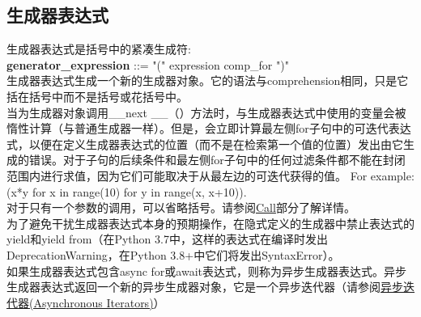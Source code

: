\documentclass[10pt,UTF8]{ctexart}
\begin{document}
\subsection{生成器表达式}
生成器表达式是括号中的紧凑生成符:\\
\textbf{generator_expression} ::= "(" expression comp_for ")"\\
\indent 生成器表达式生成一个新的生成器对象。它的语法与comprehension相同，只是它括在括号中而不是括号或花括号中。\\
\indent 当为生成器对象调用__next __（）方法时，与生成器表达式中使用的变量会被惰性计算（与普通生成器一样）。但是，会立即计算最左侧for子句中的可迭代表达式，以便在定义生成器表达式的位置（而不是在检索第一个值的位置）发出由它生成的错误。对于子句的后续条件和最左侧for子句中的任何过滤条件都不能在封闭范围内进行求值，因为它们可能取决于从最左边的可迭代获得的值。 For example: (x*y for x in range(10) for y in range(x, x+10)).\\
\indent 对于只有一个参数的调用，可以省略括号。请参阅\href{https://docs.python.org/3/reference/expressions.html#calls}{Call}部分了解详情。\\
\indent 为了避免干扰生成器表达式本身的预期操作，在隐式定义的生成器中禁止表达式的yield和yield from（在Python 3.7中，这样的表达式在编译时发出DeprecationWarning，在Python 3.8+中它们将发出SyntaxError）。\\
\indent 如果生成器表达式包含async for或await表达式，则称为异步生成器表达式。异步生成器表达式返回一个新的异步生成器对象，它是一个异步迭代器（请参阅\href{https://docs.python.org/3/reference/datamodel.html#async-iterators}{异步迭代器(Asynchronous Iterators)}）
\end{document}
